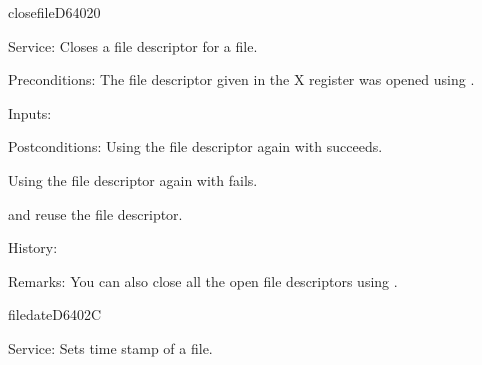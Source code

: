 \newpage
\begin{hyppotrap}{closefile}{D640}{20}
\item [Service:]
  Closes a file descriptor for a file.
\item [Preconditions:]
  The file descriptor given in the X register was opened using
  .
\item [Inputs:]
\item [Postconditions:]
  Using the file descriptor again with  succeeds.

  Using the file descriptor again with  fails.

   and  reuse the file descriptor.
\item [History:]
\item [Remarks:]
  You can also close all the open file descriptors using .
\end{hyppotrap}


\newpage
\begin{hyppotrap}{filedate}{D640}{2C}
\item [Service:]
  Sets time stamp of a file.
\notimplemented
\end{hyppotrap}


